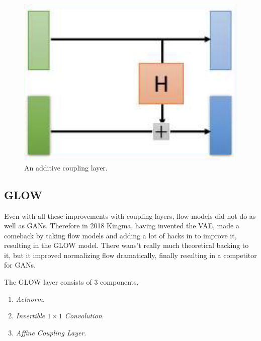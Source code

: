     \begin{figure}[H]
      \centering 
      \includegraphics[scale=0.4]{img/nice_coupling.png}
      \caption{An additive coupling layer. } 
      \label{fig:nice_coupling}
    \end{figure}

\subsection{GLOW} 

  Even with all these improvements with coupling-layers, flow models did not do as well as GANs. Therefore in 2018 Kingma, having invented the VAE, made a comeback by taking flow models and adding a lot of hacks in \cite{glow} to improve it, resulting in the GLOW model. There wans't really much theoretical backing to it, but it improved normalizing flow dramatically, finally resulting in a competitor for GANs. 

  \begin{definition}
    The GLOW layer consists of 3 components. 
    \begin{enumerate}
      \item \textit{Actnorm}. 
      \item \textit{Invertible $1 \times 1$ Convolution}. 
      \item \textit{Affine Coupling Layer}. 
    \end{enumerate}
  \end{definition} 

